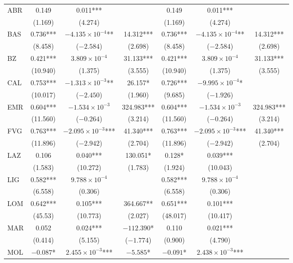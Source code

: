 \documentclass[12pt]{article}
\begin{document}
\begin{appendices}
\begin{longtable}{@{}lcccccc@{}}
            ABR & 0.149 & 0.011*** &  & 0.149 & 0.011*** &  \\ 
             & (1.169) & (4.274) &  & (1.169) & (4.274) &  \\ 
            BAS & 0.736*** & $-4.135 \times 10^{-4}$** & 14.312*** & 0.736*** & $-4.135 \times 10^{-4}$** & 14.312*** \\ 
             & (8.458) & ($-2.584$) & (2.698) & (8.458) & ($-2.584$) & (2.698) \\ 
            BZ & 0.421*** & $3.809 \times 10^{-4}$ & 31.133*** & 0.421*** & $3.809 \times 10^{-4}$ & 31.133*** \\ 
             & (10.940) & (1.375) & (3.555) & (10.940) & (1.375) & (3.555) \\ 
            CAL & 0.753*** & $-1.313 \times 10^{-3}$** & 26.157* & 0.726*** & $-9.995 \times 10^{-4}$* &  \\
             & (10.017) & ($-2.450$) & (1.960) & (9.685) & ($-1.926$) &  \\ 
            EMR & 0.604*** & $-1.534 \times 10^{-3}$ & 324.983*** & 0.604*** & $-1.534 \times 10^{-3}$ & 324.983*** \\ 
             & (11.560) & ($-0.264$) & (3.214) & (11.560) & ($-0.264$) & (3.214) \\ 
            FVG & 0.763*** & $-2.095 \times 10^{-3}$*** & 41.340*** & 0.763*** & $-2.095 \times 10^{-3}$*** & 41.340*** \\ 
             & (11.896) & ($-2.942$) & (2.704) & (11.896) & ($-2.942$) & (2.704) \\ 
            LAZ & 0.106 & 0.040*** & 130.051* & 0.128* & 0.039*** &  \\ 
             & (1.583) & (10.272) & (1.783) & (1.924) & (10.043) &  \\ 
            LIG & 0.582*** & $9.788 \times 10^{-4}$ &  & 0.582*** & $9.788 \times 10^{-4}$ &  \\ 
             & (6.558) & (0.306) &  & (6.558) & (0.306) &  \\ 
            LOM & 0.642*** & 0.105*** & 364.667** & 0.651*** & 0.101*** &  \\ 
             & (45.53) & (10.773) & (2.027) & (48.017) & (10.417) &  \\
            MAR & 0.052 & 0.024*** & $-112.390$* & 0.110 & 0.021*** &  \\ 
             & (0.414) & (5.155) & ($-1.774$) & (0.900) & (4.790) &  \\ 
            MOL & $-0.087$* & $2.455 \times 10^{-3}$*** & $-5.585$* & $-0.091$* & $2.438 \times 10^{-3}$*** &  \\ 

\end{longtable}
\end{appendices}
\end{document}
